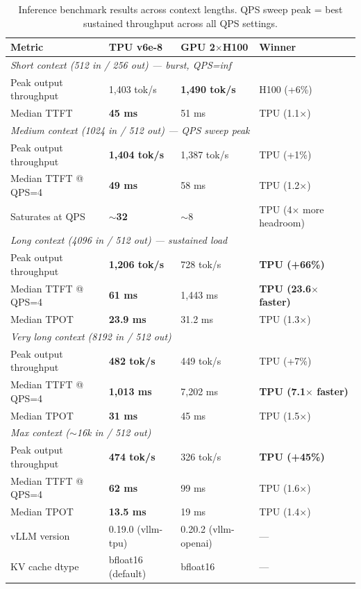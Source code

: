 \documentclass[11pt,a4paper]{article}
\begin{document}
\begin{table}[H]
\centering
\caption{Inference benchmark results across context lengths. QPS sweep peak = best sustained throughput across all QPS settings.}
\small
\begin{tabular}{p{5.5cm}lll}
\toprule
\textbf{Metric} & \textbf{TPU v6e-8} & \textbf{GPU 2$\times$H100} & \textbf{Winner} \\
\midrule
\multicolumn{4}{l}{\textit{Short context (512 in / 256 out) --- burst, QPS=inf}} \\
Peak output throughput & 1,403 tok/s & \textbf{1,490 tok/s} & H100 (+6\%) \\
Median TTFT & \textbf{45 ms} & 51 ms & TPU (1.1$\times$) \\
\midrule
\multicolumn{4}{l}{\textit{Medium context (1024 in / 512 out) --- QPS sweep peak}} \\
Peak output throughput & \textbf{1,404 tok/s} & 1,387 tok/s & TPU (+1\%) \\
Median TTFT @ QPS=4 & \textbf{49 ms} & 58 ms & TPU (1.2$\times$) \\
Saturates at QPS & \textbf{$\sim$32} & $\sim$8 & TPU (4$\times$ more headroom) \\
\midrule
\multicolumn{4}{l}{\textit{Long context (4096 in / 512 out) --- sustained load}} \\
Peak output throughput & \textbf{1,206 tok/s} & 728 tok/s & \textbf{TPU (+66\%)} \\
Median TTFT @ QPS=4 & \textbf{61 ms} & 1,443 ms & \textbf{TPU (23.6$\times$ faster)} \\
Median TPOT & \textbf{23.9 ms} & 31.2 ms & TPU (1.3$\times$) \\
\midrule
\multicolumn{4}{l}{\textit{Very long context (8192 in / 512 out)}} \\
Peak output throughput & \textbf{482 tok/s} & 449 tok/s & TPU (+7\%) \\
Median TTFT @ QPS=4 & \textbf{1,013 ms} & 7,202 ms & \textbf{TPU (7.1$\times$ faster)} \\
Median TPOT & \textbf{31 ms} & 45 ms & TPU (1.5$\times$) \\
\midrule
\multicolumn{4}{l}{\textit{Max context ($\sim$16k in / 512 out)}} \\
Peak output throughput & \textbf{474 tok/s} & 326 tok/s & \textbf{TPU (+45\%)} \\
Median TTFT @ QPS=4 & \textbf{62 ms} & 99 ms & TPU (1.6$\times$) \\
Median TPOT & \textbf{13.5 ms} & 19 ms & TPU (1.4$\times$) \\
\midrule
vLLM version & 0.19.0 (vllm-tpu) & 0.20.2 (vllm-openai) & --- \\
KV cache dtype & bfloat16 (default) & bfloat16 & --- \\
\bottomrule
\end{tabular}
\end{table}
\end{document}
